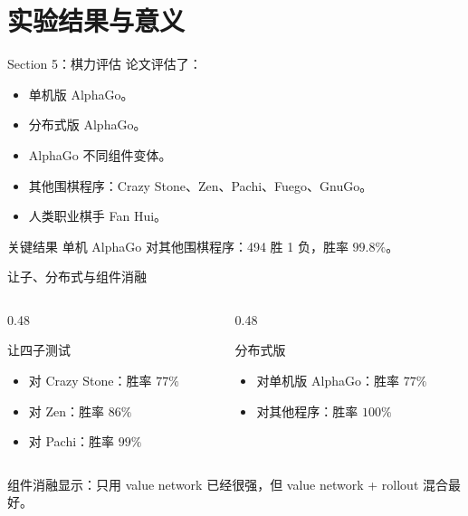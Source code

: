 \documentclass[UTF8,aspectratio=169,10pt]{ctexbeamer}
\begin{document}
\section{实验结果与意义}

\begin{frame}{Section 5：棋力评估}
  论文评估了：

  \begin{itemize}
    \item 单机版 AlphaGo。
    \item 分布式版 AlphaGo。
    \item AlphaGo 不同组件变体。
    \item 其他围棋程序：Crazy Stone、Zen、Pachi、Fuego、GnuGo。
    \item 人类职业棋手 Fan Hui。
  \end{itemize}

  \begin{block}{关键结果}
    单机 AlphaGo 对其他围棋程序：494 胜 1 负，胜率 $99.8\%$。
  \end{block}
\end{frame}

\begin{frame}{让子、分布式与组件消融}
  \begin{columns}[T,onlytextwidth]
    \begin{column}{0.48\textwidth}
      \begin{block}{让四子测试}
        \begin{itemize}
          \item 对 Crazy Stone：胜率 $77\%$
          \item 对 Zen：胜率 $86\%$
          \item 对 Pachi：胜率 $99\%$
        \end{itemize}
      \end{block}
    \end{column}
    \begin{column}{0.48\textwidth}
      \begin{block}{分布式版}
        \begin{itemize}
          \item 对单机版 AlphaGo：胜率 $77\%$
          \item 对其他程序：胜率 $100\%$
        \end{itemize}
      \end{block}
    \end{column}
  \end{columns}

  \vspace{0.4cm}
  组件消融显示：只用 value network 已经很强，但 value network + rollout 混合最好。
\end{frame}
\end{document}
